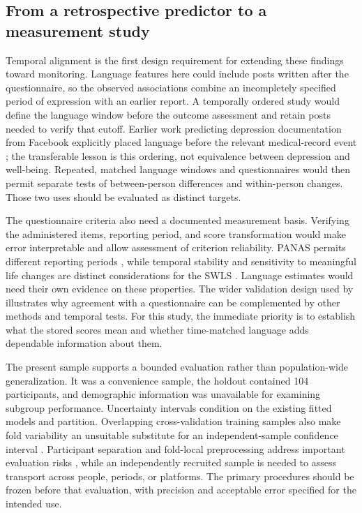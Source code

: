 \subsection{From a retrospective predictor to a measurement study}
Temporal alignment is the first design requirement for extending these findings toward monitoring. Language features here could include posts written after the questionnaire, so the observed associations combine an incompletely specified period of expression with an earlier report. A temporally ordered study would define the language window before the outcome assessment and retain posts needed to verify that cutoff. Earlier work predicting depression documentation from Facebook explicitly placed language before the relevant medical-record event \citep{eichstaedt2018}; the transferable lesson is this ordering, not equivalence between depression and well-being. Repeated, matched language windows and questionnaires would then permit separate tests of between-person differences and within-person changes. Those two uses should be evaluated as distinct targets.

The questionnaire criteria also need a documented measurement basis. Verifying the administered items, reporting period, and score transformation would make error interpretable and allow assessment of criterion reliability. PANAS permits different reporting periods \citep{watson1988}, while temporal stability and sensitivity to meaningful life changes are distinct considerations for the SWLS \citep{pavot1993}. Language estimates would need their own evidence on these properties. The wider validation design used by \citet{park2015} illustrates why agreement with a questionnaire can be complemented by other methods and temporal tests. For this study, the immediate priority is to establish what the stored scores mean and whether time-matched language adds dependable information about them.

The present sample supports a bounded evaluation rather than population-wide generalization. It was a convenience sample, the holdout contained 104 participants, and demographic information was unavailable for examining subgroup performance. Uncertainty intervals condition on the existing fitted models and partition. Overlapping cross-validation training samples also make fold variability an unsuitable substitute for an independent-sample confidence interval \citep{varoquaux2018}. Participant separation and fold-local preprocessing address important evaluation risks \citep{kapoor2023}, while an independently recruited sample is needed to assess transport across people, periods, or platforms. The primary procedures should be frozen before that evaluation, with precision and acceptable error specified for the intended use.


